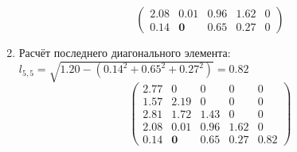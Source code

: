 \begin{multicols}{3}
\begin{enumerate}
$$\begin{pmatrix}
        2.08 & 0.01       & 0.96 & 1.62 & 0 \\
        0.14 & \mathbf{0} & 0.65 & 0.27 & 0
    \end{pmatrix}$$
    \vspace{-0.5cm}
    \item Расчёт последнего диагонального элемента: $l_{5,5} = \sqrt{1.20 - (0.14^2+0.65^2+0.27^2)} = 0.82$
    $$\begin{pmatrix}
        2.77 & 0          & 0    & 0    & 0    \\
        1.57 & 2.19       & 0    & 0    & 0    \\
        2.81 & 1.72       & 1.43 & 0    & 0    \\
        2.08 & 0.01       & 0.96 & 1.62 & 0    \\
        0.14 & \mathbf{0} & 0.65 & 0.27 & 0.82
    \end{pmatrix}$$
    \end{enumerate}



\end{multicols}
